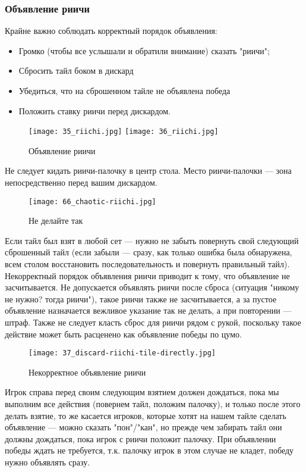 \subsubsection{Объявление риичи}

Крайне важно соблюдать корректный порядок объявления: 
\begin{itemize}
	\item Громко (чтобы все услышали и обратили внимание) сказать "риичи";
	\item Сбросить тайл боком в дискард
	\item Убедиться, что на сброшенном тайле не объявлена победа
	\item Положить ставку риичи перед дискардом.
\end{itemize}

\begin{figure}[H]
	\centering
	\texttt{[image: 35\_riichi.jpg]}
	\texttt{[image: 36\_riichi.jpg]}
	\caption{Объявление риичи}
\end{figure}

Не следует кидать риичи-палочку в центр стола. Место риичи-палочки --- зона непосредственно перед вашим дискардом. 

\begin{figure}[H]
	\centering
	\texttt{[image: 66\_chaotic-riichi.jpg]}
	\caption{Не делайте так}
\end{figure}

Если тайл был взят в любой сет --- нужно не забыть повернуть свой следующий сброшенный тайл (если забыли --- сразу, как только ошибка была обнаружена, всем столом восстановить последовательность и повернуть правильный тайл). Некорректный порядок объявления риичи приводит к тому, что объявление не засчитывается. Не допускается объявлять риичи после сброса (ситуация "никому не нужно? тогда риичи"), такое риичи также не засчитывается, а за пустое объявление назначается вежливое указание так не делать, а при повторении --- штраф. Также не следует класть сброс для риичи рядом с рукой, поскольку такое действие может быть расценено как объявление победы по цумо.

\begin{figure}[H]
	\centering
	\texttt{[image: 37\_discard-riichi-tile-directly.jpg]}
	\caption{Некорректное объявление риичи}
\end{figure}

Игрок справа перед своим следующим взятием должен дождаться, пока мы выполним все действия (повернем тайл, положим палочку), и только после этого делать взятие, то же касается игроков, которые хотят на нашем тайле сделать объявление --- можно сказать "пон"/"кан", но прежде чем забирать тайл они должны дождаться, пока игрок с риичи положит палочку. При объявлении победы ждать не требуется, т.к. палочку игрок в этом случае не кладет, победу нужно объявлять сразу.

